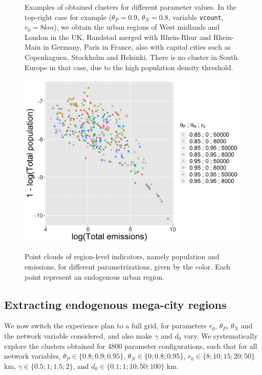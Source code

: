 \documentclass{jimis-en}
\begin{document}
\begin{figure}[h!]
  \caption{Examples of obtained clusters for different parameter values. In the top-right case for example ($\theta_P = 0.9$, $\theta_N = 0.8$, variable \texttt{vcount},$r_0 = 8km$), we obtain the urban regions of West midlands and London in the UK, Randstad merged with Rhein-Rhur and Rhein-Main in Germany, Paris in France, also with capital cities such as Copenhaguen, Stockholm and Helsinki. There is no cluster in South Europe in that case, due to the high population density threshold.\label{fig:exclusters}}
\end{figure}


\begin{figure}[h!] 
  {\includegraphics[width=0.7\linewidth]{figures/full_effective_pareto.png}}
  \centering
  \caption{Point clouds of region-level indicators, namely population and emissions, for different parametrizations, given by the color. Each point represent an endogenous urban region.\label{fig:paretos}}
\end{figure}

\subsection{Extracting endogenous mega-city regions}


We now switch the experience plan to a full grid, for parameters $r_0$, $\theta_P$, $\theta_N$ and the network variable considered, and also make $\gamma$ and $d_0$ vary. We systematically explore the clusters obtained for 4800 parameter configurations, such that for all network variables, $\theta_P \in \{ 0.8 ; 0.9 ; 0.95 \}$, $\theta_N \in \{0 ; 0.8 ; 0.95 \}$, $r_0 \in \{ 8 ; 10 ; 15 ; 20 ; 50\}$ km, $\gamma \in \{ 0.5 ; 1 ; 1.5 ; 2\}$, and $d_0 \in \{ 0.1 ; 1 ; 10 ; 50 ; 100\}$ km.
\end{document}
